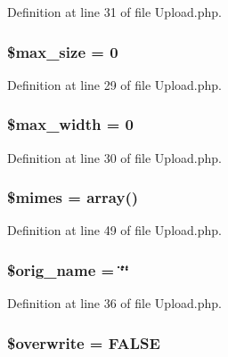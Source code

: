 Definition at line 31 of file Upload.\-php.

\subsubsection[{\$max\-\_\-size}]{\setlength{\rightskip}{0pt plus 5cm}\$max\-\_\-size = 0}\label{class_c_i___upload_a3fec414be9f76cb7ba77ed79b784de62}


Definition at line 29 of file Upload.\-php.

\subsubsection[{\$max\-\_\-width}]{\setlength{\rightskip}{0pt plus 5cm}\$max\-\_\-width = 0}\label{class_c_i___upload_a7f6a5db40a5fd00c8babbd37480b00fc}


Definition at line 30 of file Upload.\-php.

\subsubsection[{\$mimes}]{\setlength{\rightskip}{0pt plus 5cm}\$mimes = array()}\label{class_c_i___upload_a2ce7d338d1fd0f0d971ba6213ac298a2}


Definition at line 49 of file Upload.\-php.

\subsubsection[{\$orig\-\_\-name}]{\setlength{\rightskip}{0pt plus 5cm}\$orig\-\_\-name = \char`\"{}\char`\"{}}\label{class_c_i___upload_a2704f7723b97b03285de219442ae3e2b}


Definition at line 36 of file Upload.\-php.

\subsubsection[{\$overwrite}]{\setlength{\rightskip}{0pt plus 5cm}\$overwrite = F\-A\-L\-S\-E}\label{class_c_i___upload_a8d31b0ad9cccde7e2d857097672ed6cf}



